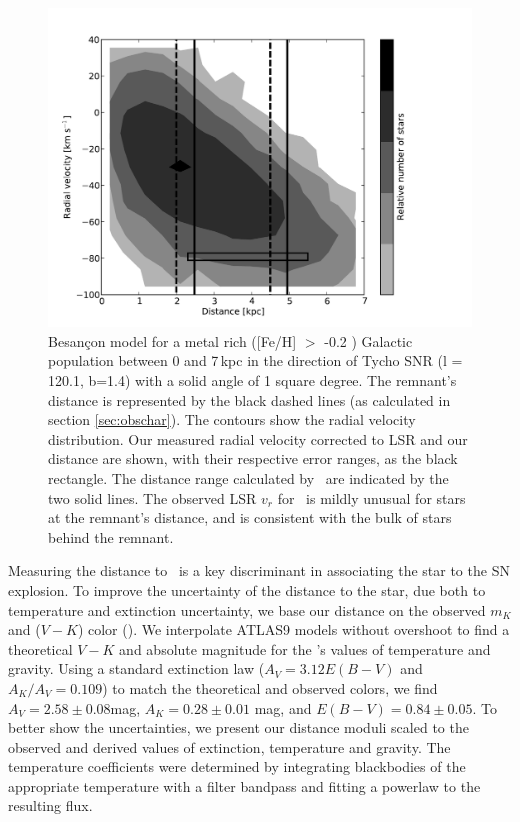 \begin{figure}[htb!]
\centering
\includegraphics* [scale=0.5,angle=0]{chapter_sn1572_starg/plots/sn1572_d_vr_subaru.pdf}
\caption{Besan\c{c}on model for a metal rich ([Fe/H] $>$ -0.2 ) Galactic population between 0 and 7\,kpc in the direction of Tycho SNR (l = 120.1, b=1.4) with a solid angle of 1 square degree.
The remnant's distance is represented by the black dashed lines (as calculated in section \ref{sec:obschar}). The contours show the radial velocity distribution. 
Our measured radial velocity corrected to LSR and our distance are shown, with their respective error ranges, as the black rectangle.  The distance  range calculated by \gh\ are indicated by the two solid lines. The observed LSR $v_r$ for \starg\ is mildly unusual for stars at the remnant's distance, and is consistent with the bulk of stars behind
the remnant. }
\label{fig:bes_d_mu}
\end{figure}

Measuring the distance to \starg\ is a key discriminant in associating the star to the SN explosion. To improve the uncertainty of the distance to the star, due both to temperature and extinction uncertainty,  we base our distance on the observed $m_K$ \citep{2006AJ....131.1163S} and ($V-K$) color (\rl).  We interpolate ATLAS9 models without overshoot \citep*{1998A&A...333..231B} to find a theoretical $V-K$ and absolute magnitude for the \gh's values of temperature and gravity. Using a standard extinction law \citep*{1989ApJ...345..245C} ($A_V= 3.12 E(B-V)$ and $A_K/A_V=0.109$) to match the theoretical and observed colors, we find $A_V=2.58\pm0.08$mag, $A_K=0.28\pm 0.01$ mag, and $E(B-V)=0.84\pm0.05$.  To better show the uncertainties, we present our distance moduli scaled to the observed and derived values of extinction, temperature and gravity.
The temperature coefficients were determined by integrating blackbodies of the appropriate temperature with a filter bandpass and fitting a powerlaw to the resulting flux. \label{sec:distmod}
 
